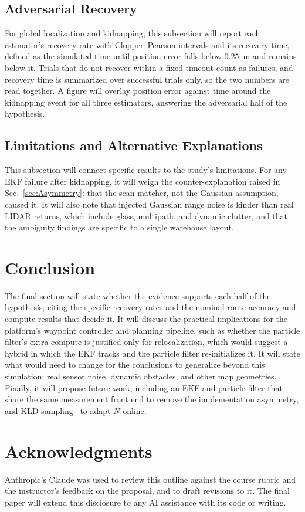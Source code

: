 \documentclass[conf]{new-aiaa}
\begin{document}
\subsection{Adversarial Recovery}\label{sec:Results-Adversarial}
For global localization and kidnapping, this subsection will report each estimator's recovery rate with Clopper--Pearson intervals and its recovery time, defined as the simulated time until position error falls below 0.25~m and remains below it. Trials that do not recover within a fixed timeout count as failures, and recovery time is summarized over successful trials only, so the two numbers are read together. A figure will overlay position error against time around the kidnapping event for all three estimators, answering the adversarial half of the hypothesis.

\subsection{Limitations and Alternative Explanations}\label{sec:Limitations}
This subsection will connect specific results to the study's limitations. For any EKF failure after kidnapping, it will weigh the counter-explanation raised in Sec.~\ref{sec:Asymmetry}: that the scan matcher, not the Gaussian assumption, caused it. It will also note that injected Gaussian range noise is kinder than real LIDAR returns, which include glass, multipath, and dynamic clutter, and that the ambiguity findings are specific to a single warehouse layout.

\section{Conclusion}\label{sec:Conclusion}
The final section will state whether the evidence supports each half of the hypothesis, citing the specific recovery rates and the nominal-route accuracy and compute results that decide it. It will discuss the practical implications for the platform's waypoint controller and planning pipeline, such as whether the particle filter's extra compute is justified only for relocalization, which would suggest a hybrid in which the EKF tracks and the particle filter re-initializes it. It will state what would need to change for the conclusions to generalize beyond this simulation: real sensor noise, dynamic obstacles, and other map geometries. Finally, it will propose future work, including an EKF and particle filter that share the same measurement front end to remove the implementation asymmetry, and KLD-sampling~\cite{fox2001kld} to adapt $N$ online.

\section*{Acknowledgments}\label{sec:Acknowledgments}
Anthropic's Claude was used to review this outline against the course rubric and the instructor's feedback on the proposal, and to draft revisions to it. The final paper will extend this disclosure to any AI assistance with its code or writing.


\end{document}

